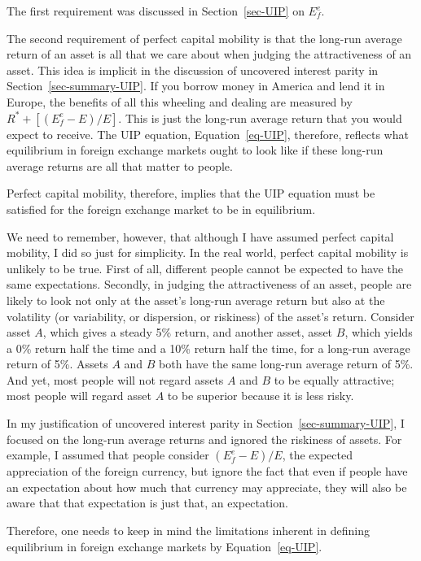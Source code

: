 \documentclass[
  letterpaper,
]{book}
\theoremstyle{plain}
\theoremstyle{remark}
\begin{document}
The first requirement was discussed in Section~\ref{sec-UIP} on
\(E_f^e\).

The second requirement of perfect capital mobility is that the long-run
average return of an asset is all that we care about when judging the
attractiveness of an asset. This idea is implicit in the discussion of
uncovered interest parity in Section~\ref{sec-summary-UIP}. If you
borrow money in America and lend it in Europe, the benefits of all this
wheeling and dealing are measured by \(R^*+[(E^e_f-E)/E]\). This is just
the long-run average return that you would expect to receive. The UIP
equation, Equation~\ref{eq-UIP}, therefore, reflects what equilibrium in
foreign exchange markets ought to look like if these long-run average
returns are all that matter to people.

Perfect capital mobility, therefore, implies that the UIP equation must
be satisfied for the foreign exchange market to be in equilibrium.

We need to remember, however, that although I have assumed perfect
capital mobility, I did so just for simplicity. In the real world,
perfect capital mobility is unlikely to be true. First of all, different
people cannot be expected to have the same expectations. Secondly, in
judging the attractiveness of an asset, people are likely to look not
only at the asset's long-run average return but also at the volatility
(or variability, or dispersion, or riskiness) of the asset's return.
Consider asset \(A\), which gives a steady 5\% return, and another
asset, asset \(B\), which yields a 0\% return half the time and a 10\%
return half the time, for a long-run average return of 5\%. Assets \(A\)
and \(B\) both have the same long-run average return of 5\%. And yet,
most people will not regard assets \(A\) and \(B\) to be equally
attractive; most people will regard asset \(A\) to be superior because
it is less risky.

In my justification of uncovered interest parity in
Section~\ref{sec-summary-UIP}, I focused on the long-run average returns
and ignored the riskiness of assets. For example, I assumed that people
consider \((E^e_f-E)/E\), the expected appreciation of the foreign
currency, but ignore the fact that even if people have an expectation
about how much that currency may appreciate, they will also be aware
that that expectation is just that, an expectation.

Therefore, one needs to keep in mind the limitations inherent in
defining equilibrium in foreign exchange markets by
Equation~\ref{eq-UIP}.
\end{document}

